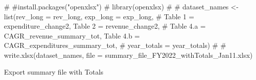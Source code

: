 \documentclass[
  letterpaper,
  DIV=11,
  numbers=noendperiod]{scrreport}
\newenvironment{Shaded}{\begin{snugshade}}{\end{snugshade}}
\newcommand{\CommentTok}[1]{\textcolor[rgb]{0.37,0.37,0.37}{#1}}
\begin{document}
\begin{Shaded}
\begin{Highlighting}[]
\CommentTok{\# \#install.packages("openxlsx")}
\CommentTok{\# library(openxlsx)}
\CommentTok{\# }
\CommentTok{\# dataset\_names \textless{}{-} list(\textquotesingle{}rev\_long\textquotesingle{} = rev\_long, \textquotesingle{}exp\_long\textquotesingle{} = exp\_long, }
\CommentTok{\#                       \textasciigrave{}Table 1\textasciigrave{} = expenditure\_change2, \textasciigrave{}Table 2\textasciigrave{} = revenue\_change2,}
\CommentTok{\#                       \textquotesingle{}Table 4.a\textquotesingle{} = CAGR\_revenue\_summary\_tot, \textquotesingle{}Table 4.b\textquotesingle{} = CAGR\_expenditures\_summary\_tot, }
\CommentTok{\#                       \textquotesingle{}year\_totals\textquotesingle{} = year\_totals)}
\CommentTok{\# }
\CommentTok{\# write.xlsx(dataset\_names, file = \textquotesingle{}summary\_file\_FY2022\_withTotals\_Jan11.xlsx\textquotesingle{})}
\end{Highlighting}
\end{Shaded}

Export summary file with Totals
\end{document}
